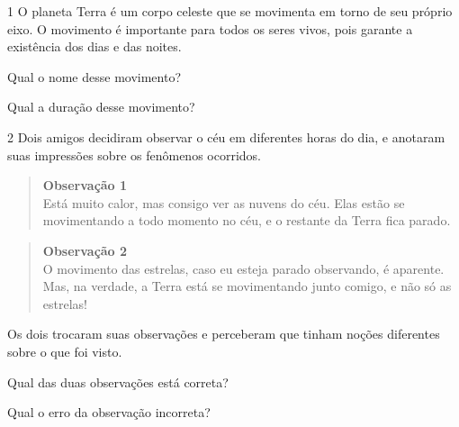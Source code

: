 
\num{1} O planeta Terra é um corpo celeste que se movimenta em
torno de seu próprio eixo. O movimento é importante para todos os seres
vivos, pois garante a existência dos dias e das noites.

\begin{escolha}
\item Qual o nome desse movimento?


\item Qual a duração desse movimento?

\end{escolha}

\num{2} Dois amigos decidiram observar o céu em diferentes horas do
dia, e anotaram suas impressões sobre os fenômenos ocorridos.

\begin{quote}
\textbf{Observação 1}\\
Está muito calor, mas consigo ver as nuvens
do céu. Elas estão se movimentando a todo momento no céu, e o restante
da Terra fica parado.
\end{quote}

\begin{quote}
\textbf{Observação 2}\\
O movimento das estrelas, caso eu esteja
parado observando, é aparente. Mas, na verdade, a Terra está se
movimentando junto comigo, e não só as estrelas!
\end{quote}

Os dois trocaram suas observações e perceberam que tinham noções
diferentes sobre o que foi visto.

\begin{escolha}
\item Qual das duas observações está correta?


\item Qual o erro da observação incorreta?

\end{escolha}

